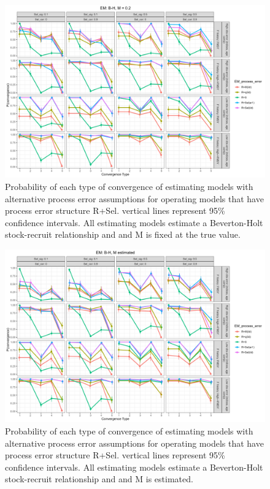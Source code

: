 \documentclass[
  12pt,
]{article}
\begin{document}
\begin{landscape}
\begin{figure}
\caption{Probability of each type of convergence of estimating models with alternative process error assumptions for operating models that have process error structure R+Sel. vertical lines represent 95\% confidence intervals. All estimating models estimate a Beverton-Holt stock-recruit relationship and and M is fixed at the true value.}\label{Sel_om_em_BH_MF_convergence}
\begin{center}
\includegraphics[width = \textwidth]{Sel_om_p_convergence_BH_M_fixed.png}
\end{center}
\end{figure}
\end{landscape}

\begin{landscape}
\begin{figure}
\caption{Probability of each type of convergence of estimating models with alternative process error assumptions for operating models that have process error structure R+Sel. vertical lines represent 95\% confidence intervals. All estimating models estimate a Beverton-Holt stock-recruit relationship and and M is estimated.}\label{Sel_om_em_BH_ME_convergence}
\begin{center}
\includegraphics[width = \textwidth]{Sel_om_p_convergence_BH_M_estimated.png}
\end{center}
\end{figure}
\end{landscape}
\end{document}
